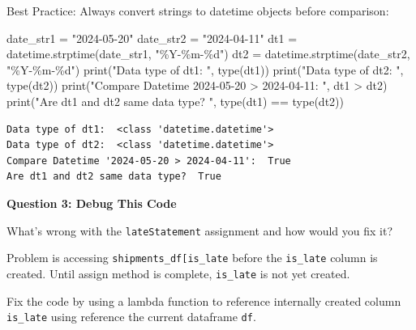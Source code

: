 \documentclass[
]{article}
\newenvironment{Shaded}{\begin{snugshade}}{\end{snugshade}}
\newcommand{\BuiltInTok}[1]{\textcolor[rgb]{0.00,0.23,0.31}{#1}}
\newcommand{\NormalTok}[1]{\textcolor[rgb]{0.00,0.23,0.31}{#1}}
\newcommand{\OperatorTok}[1]{\textcolor[rgb]{0.37,0.37,0.37}{#1}}
\newcommand{\SpecialCharTok}[1]{\textcolor[rgb]{0.37,0.37,0.37}{#1}}
\newcommand{\StringTok}[1]{\textcolor[rgb]{0.13,0.47,0.30}{#1}}
\begin{document}
Best Practice: Always convert strings to datetime objects before
comparison:

\label{compare-date-string-and-datetime-3}
\begin{Shaded}
\begin{Highlighting}[]
\NormalTok{date\_str1 }\OperatorTok{=} \StringTok{"2024{-}05{-}20"}
\NormalTok{date\_str2 }\OperatorTok{=} \StringTok{"2024{-}04{-}11"}
\NormalTok{dt1 }\OperatorTok{=}\NormalTok{ datetime.strptime(date\_str1, }\StringTok{"\%Y{-}\%m{-}}\SpecialCharTok{\%d}\StringTok{"}\NormalTok{)}
\NormalTok{dt2 }\OperatorTok{=}\NormalTok{ datetime.strptime(date\_str2, }\StringTok{"\%Y{-}\%m{-}}\SpecialCharTok{\%d}\StringTok{"}\NormalTok{)}
\BuiltInTok{print}\NormalTok{(}\StringTok{"Data type of dt1: "}\NormalTok{, }\BuiltInTok{type}\NormalTok{(dt1))}
\BuiltInTok{print}\NormalTok{(}\StringTok{"Data type of dt2: "}\NormalTok{, }\BuiltInTok{type}\NormalTok{(dt2))}
\BuiltInTok{print}\NormalTok{(}\StringTok{"Compare Datetime \textquotesingle{}2024{-}05{-}20 \textgreater{} 2024{-}04{-}11\textquotesingle{}: "}\NormalTok{, dt1 }\OperatorTok{\textgreater{}}\NormalTok{ dt2) }
\BuiltInTok{print}\NormalTok{(}\StringTok{"Are dt1 and dt2 same data type? "}\NormalTok{, }\BuiltInTok{type}\NormalTok{(dt1) }\OperatorTok{==} \BuiltInTok{type}\NormalTok{(dt2))  }
\end{Highlighting}
\end{Shaded}

\begin{verbatim}
Data type of dt1:  <class 'datetime.datetime'>
Data type of dt2:  <class 'datetime.datetime'>
Compare Datetime '2024-05-20 > 2024-04-11':  True
Are dt1 and dt2 same data type?  True
\end{verbatim}

\textbf{Question 3: Debug This Code}

What's wrong with the \texttt{lateStatement} assignment and how would
you fix it?

Problem is accessing
\texttt{shipments\_df{[}\textquotesingle{}is\_late\textquotesingle{}{]}}
before the \texttt{is\_late} column is created. Until assign method is
complete, \texttt{is\_late} is not yet created.

Fix the code by using a lambda function to reference internally created
column \texttt{is\_late} using reference the current dataframe
\texttt{df}.
\end{document}
